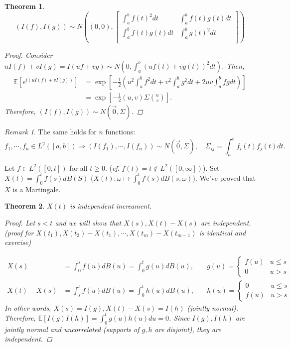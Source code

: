 \documentclass[12pt]{report}
\newcommand{\E}{\mathbb{E}}
\renewcommand{\1}{\mathbb{1}}
\theoremstyle{break}
\newtheorem{thm}{Theorem}[section] %
\theoremstyle{newdef}
\theoremstyle{remark}
\newtheorem*{rem}{Remark} %
\begin{document}
\begin{thm}
$$(I(f), I(g)) \sim N\left((0,0), 
\begin{bmatrix}
\int_a^b f(t)^2 dt & \int_a^b f(t)g(t)dt\\
\int_a^b f(t)g(t)dt & \int_a^b g(t)^2 dt  \\
\end{bmatrix}
\right)
$$
\begin{proof}
Consider $uI(f) + vI(g) = I(uf+vg) \sim N\left(0, \int_a^b (uf(t)+vg(t))^2dt\right)$.
Then,
$$
\begin{aligned}
\E\left[e^{i(uI(f)+vI(g))}\right]
&= \exp\left[-\frac{1}{2}\left(  u^2\int_a^b f^2 dt + v^2 \int_a^b g^2 dt + 2uv \int_a^b fgdt \right)   \right]\\
&= \exp\left[ -\frac{1}{2} (u,v) \Sigma {u \choose v} \right].
\end{aligned}
$$
Therefore, $(I(f), I(g)) \sim N(\vec{0}, \Sigma)$.
\end{proof}
\end{thm}

\begin{rem}
The same holds for $n$ functions:
$$f_1, \cdots, f_n \in L^2([a,b]) \Rightarrow \left( I(f_1), \cdots, I(f_n)\right) \sim N(\vec{0}, \Sigma), \quad \Sigma_{ij} = \int_a^b f_i(t)f_j(t) dt.$$
\end{rem}


Let $f\in L^2([0,t])$ for all $t \geq 0$. (\textit{cf}. $f(t) = t \not\in L^2([0,\infty])$).
Set $X(t) = \int_0^t f(s)dB(S)$ ($X(t) : \omega \mapsto \int_0^t f(s)dB(s,\omega)$).
We've proved that $X$ is a Martingale.

\begin{thm}
$X(t)$ is independent increament.
\begin{proof}
Let $s < t$ and we will show that $X(s), X(t) - X(s)$ are independent.
(proof for $X(t_1), X(t_2) - X(t_1), \cdots, X(t_m) - X(t_{m-1})$ is identical and exercise)

$$
\begin{aligned}
X(s) &= \int_0^s f(u) dB(u) = \int_0^t g(u)dB(u), \quad
&g(u) = 
\begin{cases}
    f(u) & u \leq s\\
    0 & u > s
\end{cases}
\\
X(t) - X(s) &= \int_s^t f(u) dB(u) = \int_0^t h(u)dB(u), \quad
&h(u) = 
\begin{cases}
0 & u \leq s\\
f(u) & u > s
\end{cases}
\end{aligned}
$$
In other words, $X(s) = I(g), X(t) - X(s) = I(h)$ (jointly normal).
Therefore, $\E[I(g)I(h)] = \int_0^t g(u)h(u)du = 0$.
Since  $I(g), I(h)$ are jointly normal and uncorrelated (supports of $g, h$ are disjoint), they are independent.

\end{proof}
\end{thm}
\end{document}
